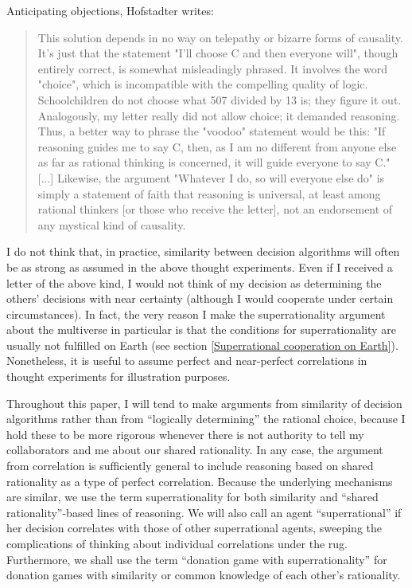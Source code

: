 \documentclass{book}
\begin{document}
Anticipating objections, Hofstadter \parencite*{Hofstadter1983-az} writes:
\begin{quote}
This solution depends in no way on telepathy or bizarre forms of causality. It’s just that the statement "I’ll choose C and then everyone will", though entirely correct, is somewhat misleadingly phrased. It involves the word "choice", which is incompatible with the compelling quality of logic. Schoolchildren do not choose what 507 divided by 13 is; they figure it out. Analogously, my letter really did not allow choice; it demanded reasoning. Thus, a better way to phrase the "voodoo" statement would be this: "If reasoning guides me to say C, then, as I am no different from anyone else as far as rational thinking is concerned, it will guide everyone to say C." [...] Likewise, the argument "Whatever I do, so will everyone else do" is simply a statement of faith that reasoning is universal, at least among rational thinkers [or those who receive the letter], not an endorsement of any mystical kind of causality.
\end{quote}
 
I do not think that, in practice, similarity between decision algorithms will often be as strong as assumed in the above thought experiments. Even if I received a letter of the above kind, I would not think of my decision as determining the others’ decisions with near certainty (although I would cooperate under certain circumstances). In fact, the very reason I make the superrationality argument about the multiverse in particular is that the conditions for superrationality are usually not fulfilled on Earth (see section \ref{Superrational cooperation on Earth}). Nonetheless, it is useful to assume perfect and near-perfect correlations in thought experiments for illustration purposes.
 
Throughout this paper, I will tend to make arguments from similarity of decision algorithms rather than from “logically determining” the rational choice, because I hold these to be more rigorous whenever there is not authority to tell my collaborators and me about our shared rationality. In any case, the argument from correlation is sufficiently general to include reasoning based on shared rationality as a type of perfect correlation. Because the underlying mechanisms are similar, we use the term superrationality for both similarity and “shared rationality”-based lines of reasoning. We will also call an agent “superrational” if her decision correlates with those of other superrational agents, sweeping the complications of thinking about individual correlations under the rug.  Furthermore, we shall use the term “donation game with superrationality” for donation games with similarity or common knowledge of each other’s rationality. %
 
\end{document}
